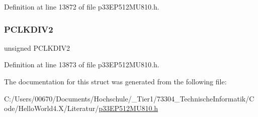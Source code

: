 Definition at line 13872 of file p33\+E\+P512\+M\+U810.\+h.

\mbox{\label{structtag_p_t_c_o_n2_b_i_t_s_a8ddd287d47ae49f7593f9e051fc67c00}} 
\subsubsection{\texorpdfstring{P\+C\+L\+K\+D\+I\+V2}{PCLKDIV2}}
{\footnotesize\ttfamily unsigned P\+C\+L\+K\+D\+I\+V2}



Definition at line 13873 of file p33\+E\+P512\+M\+U810.\+h.



The documentation for this struct was generated from the following file\+:\begin{DoxyCompactItemize}
\item 
C\+:/\+Users/00670/\+Documents/\+Hochschule/\+\_\+\+Tier1/73304\+\_\+\+Technische\+Informatik/\+Code/\+Hello\+World4.\+X/\+Literatur/\hyperlink{p33_e_p512_m_u810_8h}{p33\+E\+P512\+M\+U810.\+h}\end{DoxyCompactItemize}
